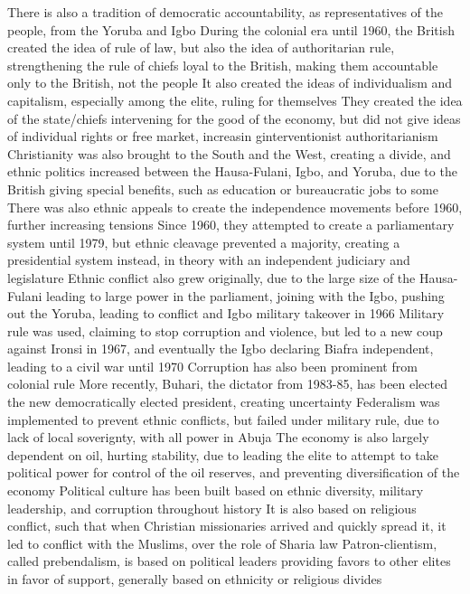 \documentclass[11 pt, twoside]{article}
\newenvironment{outline*}
{
	\begin{outline}[enumerate]
	}
	{\end{outline}
}
\begin{document}
\begin{outline*}
\2 There is also a tradition of democratic accountability, as representatives of the people, from the Yoruba and Igbo
\1 During the colonial era until 1960, the British created the idea of rule of law, but also the idea of authoritarian rule, strengthening the rule of chiefs loyal to the British, making them accountable only to the British, not the people
\2 It also created the ideas of individualism and capitalism, especially among the elite, ruling for themselves
\2 They created the idea of the state/chiefs intervening for the good of the economy, but did not give ideas of individual rights or free market, increasin ginterventionist authoritarianism
\2 Christianity was also brought to the South and the West, creating a divide, and ethnic politics increased between the Hausa-Fulani, Igbo, and Yoruba, due to the British giving special benefits, such as education or bureaucratic jobs to some
\3 There was also ethnic appeals to create the independence movements before 1960, further increasing tensions
\1 Since 1960, they attempted to create a parliamentary system until 1979, but ethnic cleavage prevented a majority, creating a presidential system instead, in theory with an independent judiciary and legislature
\2 Ethnic conflict also grew originally, due to the large size of the Hausa-Fulani leading to large power in the parliament, joining with the Igbo, pushing out the Yoruba, leading to conflict and Igbo military takeover in 1966
\2 Military rule was used, claiming to stop corruption and violence, but led to a new coup against Ironsi in 1967, and eventually the Igbo declaring Biafra independent, leading to a civil war until 1970
\3 Corruption has also been prominent from colonial rule
\3 More recently, Buhari, the dictator from 1983-85, has been elected the new democratically elected president, creating uncertainty
\2 Federalism was implemented to prevent ethnic conflicts, but failed under military rule, due to lack of local soverignty, with all power in Abuja
\2 The economy is also largely dependent on oil, hurting stability, due to leading the elite to attempt to take political power for control of the oil reserves, and preventing diversification of the economy
\1 Political culture has been built based on ethnic diversity, military leadership, and corruption throughout history
\2 It is also based on religious conflict, such that when Christian missionaries arrived and quickly spread it, it led to conflict with the Muslims, over the role of Sharia law
\2 Patron-clientism, called prebendalism, is based on political leaders providing favors to other elites in favor of support, generally based on ethnicity or religious divides

\end{outline*}
\end{document}
